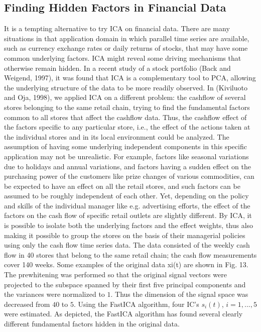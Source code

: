 \documentclass[12pt, a4paper, onecolumn]{IEEEtran}
\begin{document}
\subsection{Finding Hidden Factors in Financial Data}
It is a tempting alternative to try ICA on financial data. There are many situations in that application domain in which parallel time series are available, such as currency exchange rates or daily returns of stocks, that may have some common underlying factors. ICA might reveal some driving mechanisms that otherwise remain hidden. In a recent study of a stock portfolio (Back and Weigend, 1997), it was found that ICA is a complementary tool to PCA, allowing the underlying structure of the data to be more readily observed.
In (Kiviluoto and Oja, 1998), we applied ICA on a different problem: the cashflow of several stores belonging to the same retail chain, trying to find the fundamental factors common to all stores that affect the cashflow data. Thus, the cashflow effect of the factors specific to any particular store, i.e., the effect of the actions taken at the individual stores and in its local environment could be analyzed.
The assumption of having some underlying independent components in this specific application may not be unrealistic. For example, factors like seasonal variations due to holidays and annual variations, and factors having a sudden effect on the purchasing power of the customers like prize changes of various commodities, can be expected to have an effect on all the retail stores, and such factors can be assumed to be roughly independent of each other. Yet, depending on the policy and skills of the individual manager like e.g. advertising efforts, the effect of the factors on the cash flow of specific retail outlets are slightly different. By ICA, it is possible to isolate both the underlying factors and the effect weights, thus also making it possible to group the stores on the basis of their managerial policies using only the cash flow time series data.
The data consisted of the weekly cash flow in 40 stores that belong to the same retail chain; the cash flow measurements cover 140 weeks. Some examples of the original data xi(t) are shown in Fig. 13.
The prewhitening was performed so that the original signal vectors were projected to the subspace spanned by their first five principal components and the variances were normalized to $1$. Thus the dimension of the signal space was decreased from $40$ to $5$. Using the FastICA algorithm, four IC’s $s_i(t)$, $i = 1,...,5$ were estimated. As depicted, the FastICA algorithm has found several clearly different fundamental factors hidden in the original data.
\end{document}
